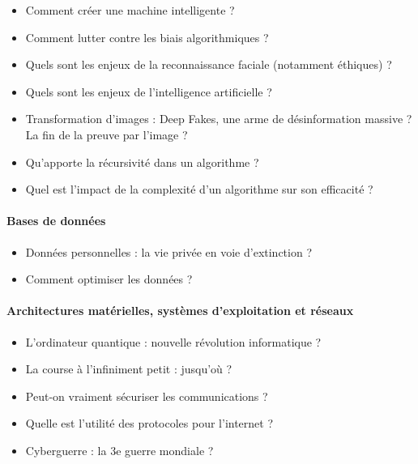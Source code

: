 \documentclass[
  letterpaper,
  DIV=11,
  numbers=noendperiod]{scrartcl}
\let\oldparagraph\paragraph
\renewcommand{\paragraph}[1]{\oldparagraph{#1}\mbox{}}
\providecommand{\tightlist}{%
  \setlength{\itemsep}{0pt}\setlength{\parskip}{0pt}}\usepackage{longtable,booktabs,array}
\begin{document}
\begin{itemize}
\tightlist
\item
  Comment créer une machine intelligente ?
\item
  Comment lutter contre les biais algorithmiques ?
\item
  Quels sont les enjeux de la reconnaissance faciale (notamment
  éthiques) ?
\item
  Quels sont les enjeux de l'intelligence artificielle ?
\item
  Transformation d'images : Deep Fakes, une arme de désinformation
  massive ? La fin de la preuve par l'image ?
\item
  Qu'apporte la récursivité dans un algorithme ?
\item
  Quel est l'impact de la complexité d'un algorithme sur son efficacité
  ?
\end{itemize}

\hypertarget{bases-de-donnuxe9es}{%
\paragraph{Bases de données}\label{bases-de-donnuxe9es}}

\begin{itemize}
\tightlist
\item
  Données personnelles : la vie privée en voie d'extinction ?
\item
  Comment optimiser les données ?
\end{itemize}

\hypertarget{architectures-matuxe9rielles-systuxe8mes-dexploitation-et-ruxe9seaux}{%
\paragraph{Architectures matérielles, systèmes d'exploitation et
réseaux}\label{architectures-matuxe9rielles-systuxe8mes-dexploitation-et-ruxe9seaux}}

\begin{itemize}
\tightlist
\item
  L'ordinateur quantique : nouvelle révolution informatique ?
\item
  La course à l'infiniment petit : jusqu'où ?
\item
  Peut-on vraiment sécuriser les communications ?
\item
  Quelle est l'utilité des protocoles pour l'internet ?
\item
  Cyberguerre : la 3e guerre mondiale ?
\end{itemize}
\end{document}
